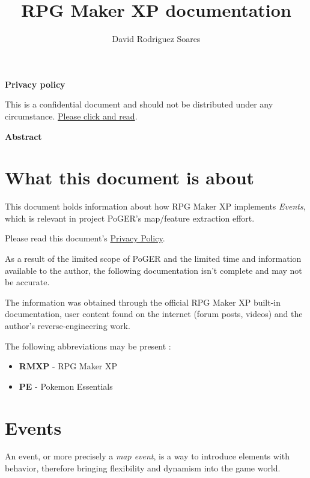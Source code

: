 \documentclass[11pt]{article}
\title{RPG Maker XP documentation}
\author{David Rodriguez Soares}
\begin{document}
\maketitle

\vspace{90mm}

\textbf{Privacy policy}

This is a confidential document and should not be distributed under any circumstance. \hyperref[sec:privacypolice]{Please click and read}.

\textbf{Abstract}

\lipsum[2-3]


\newpage

\begingroup
\hypersetup{linkcolor=black}
\tableofcontents
\endgroup

\newpage
\section{What this document is about}

This document holds information about how RPG Maker XP implements \textit{Events}, which is relevant in project PoGER's map/feature extraction effort.

Please read this document's \hyperref[sec:privacypolice]{Privacy Policy}.

As a result of the limited scope of PoGER and the limited time and information available to the author, the following documentation isn't complete and may not be accurate.

The information was obtained through the official RPG Maker XP built-in documentation, user content found on the internet (forum posts, videos) and the author's reverse-engineering work.

The following abbreviations may be present :
\begin{itemize}
	\item \textbf{RMXP} - RPG Maker XP
	\item \textbf{PE} - Pokemon Essentials
\end{itemize}



\section{Events}

An event, or more precisely a \textit{map event}, is a way to introduce elements with behavior, therefore bringing flexibility and dynamism into the game world.
\end{document}
